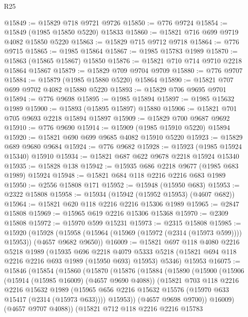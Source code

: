 \begin{lexlean}{R25}
\begin{coremodule}
@15849 := @15829 @718 @9721 @9726
@15850 := @776 @9724
@15854 := @15849 (@1985 @15850 @5220) @15833
@15860 := @15821 @716 @699 @9719 @4082 @15850 @5220
@15863 := @15829 @715 @9712 @9718
@15864 := @776 @9715
@15865 := @1985 @15864
@15867 := @1985 @15783 @1989
@15870 := @15863 (@15865 @15867) @15850
@15876 := @15821 @710 @714 @9710 @2218 @15864 @15867
@15879 := @15829 @709 @9704 @9709
@15880 := @776 @9707
@15884 := @15879 (@1985 @15880 @5220) @15864
@15890 := @15821 @707 @699 @9702 @4082 @15880 @5220
@15893 := @15829 @706 @9695 @9701
@15894 := @776 @9698
@15895 := @1985 @15894
@15897 := @1985 @15632 @1989
@15900 := @15893 (@15895 @15897) @15880
@15906 := @15821 @701 @705 @9693 @2218 @15894 @15897
@15909 := @15829 @700 @9687 @9692
@15910 := @776 @9690
@15914 := @15909 (@1985 @15910 @5220) @15894
@15920 := @15821 @690 @699 @9685 @4082 @15910 @5220
@15923 := @15829 @689 @9680 @9684
@15924 := @776 @9682
@15928 := @15923 (@1985 @15924 @15340) @15910
@15934 := @15821 @687 @622 @9678 @2218 @15924 @15340
@15935 := @15828 @138
@15942 := @15935 @686 @2218 @9677 (@1985 @683 @1989) @15924
@15948 := @15821 @684 @118 @2216 @2216 @683 @1989
@15950 := @2556 @15808 @171
@15952 := @15948 (@15950 @683)
@15953 := @2322 @15808
@15958 := @15934 (@15942 (@15952 @15953) (@4607 @682))
@15964 := @15821 @620 @118 @2216 @2216 @15306 @1989
@15965 := @2847 @15808
@15969 := @15965 @619 @2216 @15306 @15368
@15970 := @2309 @15808
@15972 := @15970 @599 @15231
@15973 := @2315 @15808
@15985 := @15920
    (@15928 (@15958 (@15964 (@15969 (@15972 (@2314 (@15973 @599)))) @15953)) (@4657 @9682 @9650))
@16009 := @15821
    @697
    @118
    @4080
    @2216
    @5218
    @1989
    (@15935
      @696
      @2218
      @4079
      @5333
      @5218
      (@15821 @694 @118 @2216 @2216 @693 @1989 (@15950 @693) @15953)
      @5346)
    @15953
@16075 := @15846
    (@15854
      (@15860
        (@15870
          (@15876
            (@15884
              (@15890
                (@15900
                  (@15906
                    (@15914 (@15985 @16009) (@4657 @9690 @4088))
                    (@15821
                      @703
                      @118
                      @2216
                      @2216
                      @15632
                      @1989
                      (@15965 @656 @2216 @15632 @15576 (@15970 @633 @15417 (@2314 (@15973 @633))))
                      @15953))
                  (@4657 @9698 @9700))
                @16009)
              (@4657 @9707 @4088))
            (@15821
              @712
              @118
              @2216
              @2216
              @15783

\end{coremodule}
\end{lexlean}
